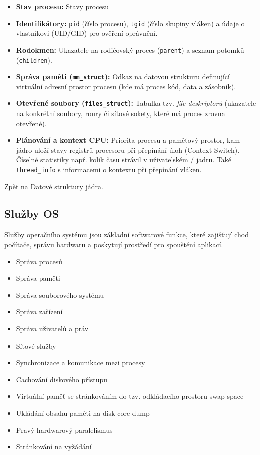 \begin{itemize}
    \item \textbf{Stav procesu:} \hyperref[prg:stavy]{Stavy procesu} 
    \item \textbf{Identifikátory:} \texttt{pid} (číslo procesu), \texttt{tgid} (číslo skupiny vláken) a údaje o vlastníkovi (UID/GID) pro ověření oprávnění.
    \item \textbf{Rodokmen:} Ukazatele na rodičovský proces (\texttt{parent}) a seznam potomků (\texttt{children}).
    \item \textbf{Správa paměti (\texttt{mm\_struct}):} Odkaz na datovou strukturu definující virtuální adresní prostor procesu (kde má proces kód, data a zásobník).
    \item \textbf{Otevřené soubory (\texttt{files\_struct}):} Tabulka tzv. \textit{file deskriptorů} (ukazatele na konkrétní soubory, roury či síťové sokety, které má proces zrovna otevřené).
    \item \textbf{Plánování a kontext CPU:} Priorita procesu a paměťový prostor, kam jádro uloží stavy registrů procesoru při přepínání úloh (Context Switch). Číselné statistiky např. kolik času strávil v uživatelském / jadru. Také \texttt{thread\_info} s informacemi o kontextu při přepínání vláken.
\end{itemize}
Zpět na \hyperref[prg:datastructs]{Datové struktury jádra}.

\subsection{Služby OS}
Služby operačního systému jsou základní softwarové funkce, které zajišťují chod počítače, správu hardwaru a poskytují prostředí pro spouštění aplikací.
\begin{itemize}
    \item Správa procesů
    \item Správa paměti
    \item Správa souborového systému
    \item Správa zařízení
    \item Správa uživatelů a práv
    \item Síťové služby
    \item Synchronizace a komunikace mezi procesy
    \item Cachování diskového přístupu
    \item Virtuální paměť se stránkováním do tzv. odkládacího prostoru swap space
    \item Ukládání obsahu paměti na disk core dump
    \item Pravý hardwarový paralelismus
    \item Stránkování na vyžádání
\end{itemize}

